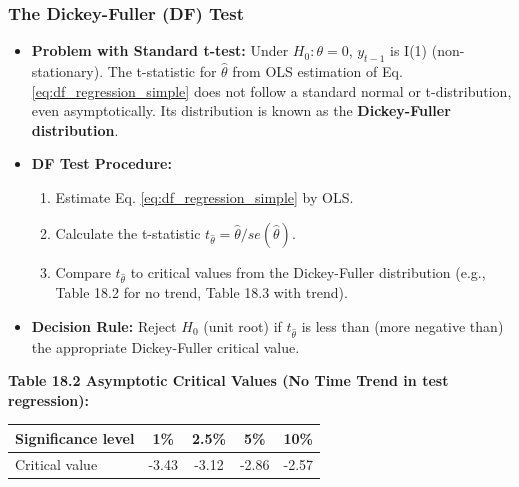\documentclass[a4paper, 10pt]{article}
\theoremstyle{definition}	%
\begin{document}
\subsubsection{The Dickey-Fuller (DF) Test}
\begin{itemize}
    \item \textbf{Problem with Standard t-test:} Under \(H_0: \theta=0\), \(y_{t-1}\) is I(1) (non-stationary). The t-statistic for \(\hat{\theta}\) from OLS estimation of Eq. \eqref{eq:df_regression_simple} does not follow a standard normal or t-distribution, even asymptotically. Its distribution is known as the \textbf{Dickey-Fuller distribution}.
    \item \textbf{DF Test Procedure:}
    \begin{enumerate}
        \item Estimate Eq. \eqref{eq:df_regression_simple} by OLS.
        \item Calculate the t-statistic \(t_{\hat{\theta}} = \hat{\theta} / se(\hat{\theta})\).
        \item Compare \(t_{\hat{\theta}}\) to critical values from the Dickey-Fuller distribution (e.g., Table 18.2 for no trend, Table 18.3 with trend).
    \end{enumerate}
    \item \textbf{Decision Rule:} Reject \(H_0\) (unit root) if \(t_{\hat{\theta}}\) is less than (more negative than) the appropriate Dickey-Fuller critical value.
\end{itemize}
\textbf{Table 18.2 Asymptotic Critical Values (No Time Trend in test regression):}
\begin{center}
\begin{tabular}{|l|c|c|c|c|}
\hline
Significance level & 1\% & 2.5\% & 5\% & 10\% \\
\hline
Critical value & -3.43 & -3.12 & -2.86 & -2.57 \\
\hline
\end{tabular}
\end{center}
\end{document}
